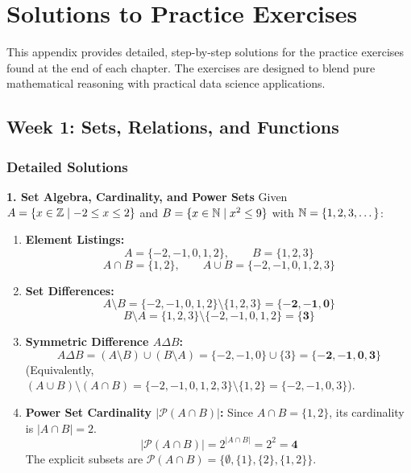 \appendix
\chapter{Solutions to Practice Exercises}

This appendix provides detailed, step-by-step solutions for the practice exercises found at the end of each chapter. The exercises are designed to blend pure mathematical reasoning with practical data science applications.

\section*{Week 1: Sets, Relations, and Functions}

\subsection*{Detailed Solutions}

\textbf{1. Set Algebra, Cardinality, and Power Sets}
Given $A = \{x \in \mathbb{Z} \mid -2 \le x \le 2\}$ and $B = \{x \in \mathbb{N} \mid x^2 \le 9\}$ with $\mathbb{N} = \{1, 2, 3, \dots\}$:
\begin{enumerate}
    \item \textbf{Element Listings:}
    $$A = \{-2, -1, 0, 1, 2\}, \qquad B = \{1, 2, 3\}$$
    $$A \cap B = \{1, 2\}, \qquad A \cup B = \{-2, -1, 0, 1, 2, 3\}$$
    \item \textbf{Set Differences:}
    $$A \setminus B = \{-2, -1, 0, 1, 2\} \setminus \{1, 2, 3\} = \mathbf{\{-2, -1, 0\}}$$
    $$B \setminus A = \{1, 2, 3\} \setminus \{-2, -1, 0, 1, 2\} = \mathbf{\{3\}}$$
    \item \textbf{Symmetric Difference $A \Delta B$:}
    $$A \Delta B = (A \setminus B) \cup (B \setminus A) = \{-2, -1, 0\} \cup \{3\} = \mathbf{\{-2, -1, 0, 3\}}$$
    (Equivalently, $(A \cup B) \setminus (A \cap B) = \{-2, -1, 0, 1, 2, 3\} \setminus \{1, 2\} = \{-2, -1, 0, 3\}$).
    \item \textbf{Power Set Cardinality $|\mathcal{P}(A \cap B)|$:}
    Since $A \cap B = \{1, 2\}$, its cardinality is $|A \cap B| = 2$.
    $$|\mathcal{P}(A \cap B)| = 2^{|A \cap B|} = 2^2 = \mathbf{4}$$
    The explicit subsets are $\mathcal{P}(A \cap B) = \{\emptyset, \{1\}, \{2\}, \{1, 2\}\}$.
\end{enumerate}

